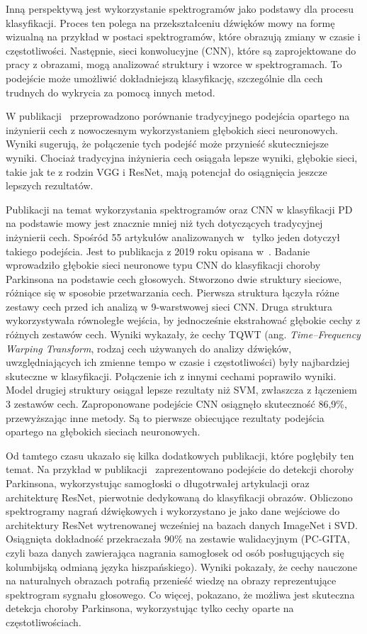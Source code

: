 Inną perspektywą jest wykorzystanie spektrogramów jako podstawy dla procesu klasyfikacji.
Proces ten polega na przekształceniu dźwięków mowy na formę wizualną na przykład w postaci spektrogramów, które obrazują zmiany w czasie i częstotliwości.
Następnie, sieci konwolucyjne (CNN), które są zaprojektowane do pracy z obrazami, mogą analizować struktury i wzorce w spektrogramach.
To podejście może umożliwić dokładniejszą klasyfikację, szczególnie dla cech trudnych do wykrycia za pomocą innych metod.

W publikacji~\cite{Majda-Zdancewicz_Potulska-Chromik_Jakubowski_Nojszewska_Kostera-Pruszczyk} przeprowadzono porównanie tradycyjnego podejścia
opartego na inżynierii cech z nowoczesnym wykorzystaniem głębokich sieci neuronowych.
Wyniki sugerują, że połączenie tych podejść może przynieść skuteczniejsze wyniki.
Chociaż tradycyjna inżynieria cech osiągała lepsze wyniki, głębokie sieci, takie jak te z rodzin VGG i ResNet, mają potencjał do osiągnięcia jeszcze
lepszych rezultatów.

Publikacji na temat wykorzystania spektrogramów oraz CNN w klasyfikacji PD na podstawie mowy jest znacznie mniej niż tych dotyczących tradycyjnej inżynierii cech.
Spośród 55 artykułów analizowanych w~\cite{ML_for_PD_review} tylko jeden dotyczył takiego podejścia.
Jest to publikacja z 2019 roku opisana w~\cite{Gunduz}.
Badanie wprowadziło głębokie sieci neuronowe typu CNN do klasyfikacji choroby Parkinsona na podstawie cech głosowych.
Stworzono dwie struktury sieciowe, różniące się w sposobie przetwarzania cech.
Pierwsza struktura łączyła różne zestawy cech przed ich analizą w 9-warstwowej sieci CNN. Druga struktura wykorzystywała
równoległe wejścia, by jednocześnie ekstrahować głębokie cechy z różnych zestawów cech.
Wyniki wykazały, że cechy TQWT (ang. \emph{Time–Frequency Warping Transform}, rodzaj cech używanych do analizy dźwięków,
uwzględniających ich zmienne tempo w czasie i częstotliwości) były najbardziej skuteczne w klasyfikacji.
Połączenie ich z innymi cechami poprawiło wyniki.
Model drugiej struktury osiągał lepsze rezultaty niż SVM, zwłaszcza z łączeniem 3 zestawów cech.
Zaproponowane podejście CNN osiągnęło skuteczność 86,9\%, przewyższając inne metody.
Są to pierwsze obiecujące rezultaty podejścia opartego na głębokich sieciach neuronowych.

Od tamtego czasu ukazało się kilka dodatkowych publikacji, które pogłębiły ten temat.
Na przykład w publikacji~\cite{Wodzinski} zaprezentowano podejście do detekcji choroby Parkinsona, wykorzystując samogłoski o długotrwałej artykulacji oraz architekturę ResNet,
pierwotnie dedykowaną do klasyfikacji obrazów.
Obliczono spektrogramy nagrań dźwiękowych i wykorzystano je jako dane wejściowe do architektury ResNet wytrenowanej wcześniej na bazach danych ImageNet i SVD.
Osiągnięta dokładność przekraczała 90\% na zestawie walidacyjnym (PC-GITA, czyli baza danych zawierająca nagrania samogłosek od
osób posługujących się kolumbijską odmianą języka hiszpańskiego).
Wyniki pokazały, że cechy  nauczone na naturalnych obrazach potrafią przenieść wiedzę na obrazy reprezentujące spektrogram sygnału głosowego.
Co więcej, pokazano, że możliwa jest skuteczna detekcja choroby Parkinsona, wykorzystując tylko cechy oparte na częstotliwościach.


